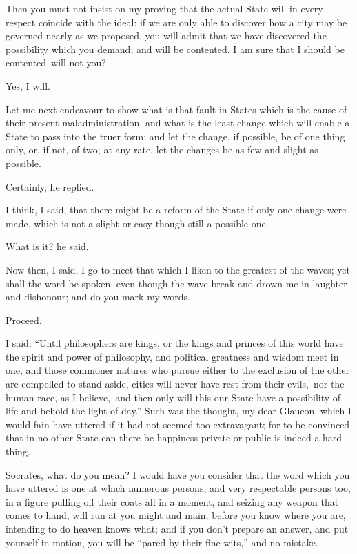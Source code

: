 Then you must not insist on my proving that the actual State will in
every respect coincide with the ideal: if we are only able to discover
how a city may be governed nearly as we proposed, you will admit that we
have discovered the possibility which you demand; and will be contented.
I am sure that I should be contented--will not you?

Yes, I will.

Let me next endeavour to show what is that fault in States which is the
cause of their present maladministration, and what is the least change
which will enable a State to pass into the truer form; and let the
change, if possible, be of one thing only, or, if not, of two; at any
rate, let the changes be as few and slight as possible.

Certainly, he replied.

I think, I said, that there might be a reform of the State if only one
change were made, which is not a slight or easy though still a possible
one.

What is it? he said.

Now then, I said, I go to meet that which I liken to the greatest of
the waves; yet shall the word be spoken, even though the wave break and
drown me in laughter and dishonour; and do you mark my words.

Proceed.

I said: ``Until philosophers are kings, or the kings and princes of this
world have the spirit and power of philosophy, and political greatness
and wisdom meet in one, and those commoner natures who pursue either
to the exclusion of the other are compelled to stand aside, cities
will never have rest from their evils,--nor the human race, as I
believe,--and then only will this our State have a possibility of life
and behold the light of day.'' Such was the thought, my dear Glaucon,
which I would fain have uttered if it had not seemed too extravagant;
for to be convinced that in no other State can there be happiness
private or public is indeed a hard thing.

Socrates, what do you mean? I would have you consider that the word
which you have uttered is one at which numerous persons, and very
respectable persons too, in a figure pulling off their coats all in a
moment, and seizing any weapon that comes to hand, will run at you might
and main, before you know where you are, intending to do heaven knows
what; and if you don't prepare an answer, and put yourself in motion,
you will be ``pared by their fine wits,'' and no mistake.

